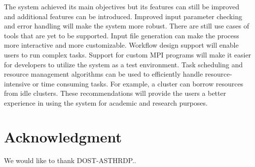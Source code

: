 The system achieved its main objectives but its features can still be improved and additional features can be introduced. Improved input parameter checking and error handling will make the system more robust. There are still use cases of tools that are yet to be supported. Input file generation can make the process more interactive and more customizable.  Workflow design support will enable users to run complex tasks. Support for custom MPI programs will make it easier for developers to utilize the system as a test environment. Task scheduling and resource management algorithms can be used to efficiently handle resource-intensive or time consuming tasks. For example, a cluster can borrow resources from idle clusters. These recommendations will provide the users a better experience in using the system for academic and research purposes. 




\section*{Acknowledgment}
We would like to thank DOST-ASTHRDP..





